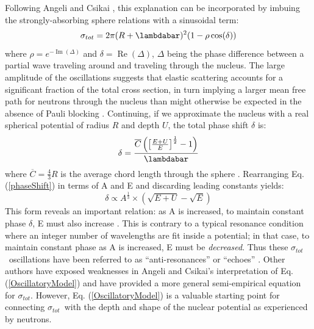\documentclass[twocolumn,secnumarabic,amssymb, nobibnotes, aps, prl,
superscriptaddress, nobalancelastpage]{revtex4}
\newcommand{\tot}{\ensuremath{\sigma_{tot}}}
\begin{document}
Following Angeli and Csikai \cite{Angeli1970}, this explanation can be
incorporated by imbuing the strongly-absorbing sphere relations
with a sinusoidal term:
\begin{equation} \label{OscillatoryModel}
    \tot = 2\pi (R+\lambdabar)^{2}(1 - \rho \cos(\delta))
\end{equation}
where $\rho = e^{-\operatorname{Im}(\Delta)}$ and $\delta =
\operatorname{Re}(\Delta)$, $\Delta$ being the phase difference between a
partial wave traveling
around and traveling through the nucleus. The large amplitude of the
oscillations suggests that elastic scattering accounts for a
significant fraction of the total cross section, in turn implying a 
larger mean free path for neutrons through the nucleus 
than might otherwise be expected in the absence of Pauli blocking
\cite{Mohr1955, Feshbach1958}.
Continuing, if we approximate the nucleus with a
real spherical potential of radius $R$ and depth $U$, the total phase shift $\delta$ is:
\begin{equation} \label{phaseShift}
    \delta =
    \frac{\overline{C}\left(\left[{\frac{E+U}{E}}\right]^{\frac{1}{2}}-1\right)}{\lambdabar}
\end{equation}
where $\overline{C} = \frac{4}{3}R$ is the average chord length through the
sphere \cite{Angeli1970}. Rearranging Eq. (\ref{phaseShift}) in terms of A and E and
discarding leading constants yields:
\begin{equation}
    \delta \propto A^{\frac{1}{3}}\times\left(\sqrt{E+U}-\sqrt{E}\right)
\end{equation}
This form reveals an important relation: as A is increased, to maintain constant 
phase $\delta$, E must also increase \cite{Satchler1980, Peterson1962}. 
This is contrary to a typical resonance condition where an integer number of wavelengths
are fit inside a potential; in that case, to maintain constant phase as A is increased,
E must be \textit{decreased}. Thus these \tot\ oscillations have been referred to as
``anti-resonances'' or ``echoes'' \cite{Satchler1980, McVoy1967}.
Other authors \cite{Ahmad1973} have
exposed weaknesses in Angeli and Csikai's interpretation of
Eq. (\ref{OscillatoryModel}) and have provided a more general semi-empirical
equation for \tot. However, Eq. (\ref{OscillatoryModel}) is a valuable starting
point for connecting \tot\ with the depth and shape of the nuclear
potential as experienced by neutrons.
\end{document}
